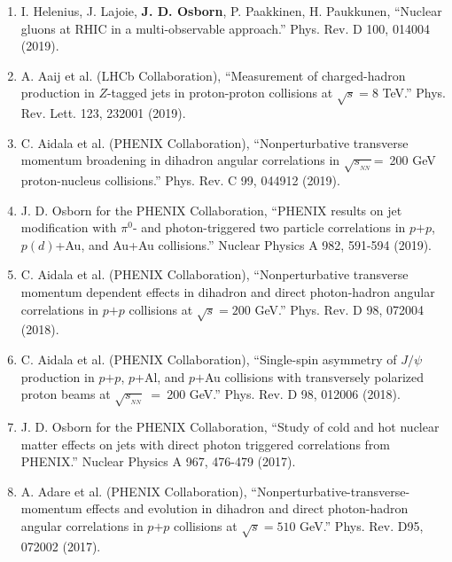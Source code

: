 \documentclass[11pt]{article}
\newcommand{\snn}{\sqrt{s_{_{NN}}}}
\begin{document}
\begin{flushleft}
\begin{center}
\begin{enumerate}
	\item I. Helenius, J. Lajoie, {\bf{J. D. Osborn}}, P. Paakkinen, H. Paukkunen, ``Nuclear gluons at RHIC in a multi-observable approach.'' Phys. Rev. D 100, 014004 (2019).
	
	\item A. Aaij et al. (LHCb Collaboration), ``Measurement of charged-hadron production in $Z$-tagged jets in proton-proton collisions at $\sqrt{s}=8$ TeV.'' Phys. Rev. Lett. 123, 232001 (2019).
	
	\item C. Aidala et al. (PHENIX Collaboration), ``Nonperturbative transverse momentum broadening in dihadron angular correlations in $\sqrt{s_{_{NN}}}$=~200 GeV proton-nucleus collisions.''  Phys. Rev. C 99, 044912 (2019).

	\item J. D. Osborn for the PHENIX Collaboration, ``PHENIX results on jet modification with $\pi^0$- and photon-triggered two particle correlations in $p$$+$$p$, $p(d)$+Au, and Au+Au collisions.'' Nuclear Physics A 982, 591-594 (2019).

	\item C. Aidala et al. (PHENIX Collaboration), ``Nonperturbative transverse momentum dependent effects in dihadron and direct photon-hadron angular correlations in $p$$+$$p$ collisions at $\sqrt{s}=200$ GeV.'' Phys. Rev. D 98, 072004 (2018).
		
		
	\item C. Aidala et al. (PHENIX Collaboration), ``Single-spin asymmetry of $J/\psi$ production in $p$$+$$p$, $p$+Al, and $p$$+$Au collisions with transversely polarized proton beams at $\snn$~=~200 GeV.'' Phys. Rev. D 98, 012006 (2018).
	
	\item J. D. Osborn for the PHENIX Collaboration, ``Study of cold and hot nuclear matter effects on jets with direct photon triggered correlations from PHENIX.'' Nuclear Physics A 967, 476-479 (2017).
	
	\item A. Adare et al. (PHENIX Collaboration), ``Nonperturbative-transverse-momentum effects and evolution in dihadron and direct photon-hadron angular correlations in $p$$+$$p$ collisions at $\sqrt{s}=510$ GeV.''  Phys. Rev. D95, 072002 (2017).
	
\end{enumerate}
\end{center}
\end{flushleft}
\end{document}
